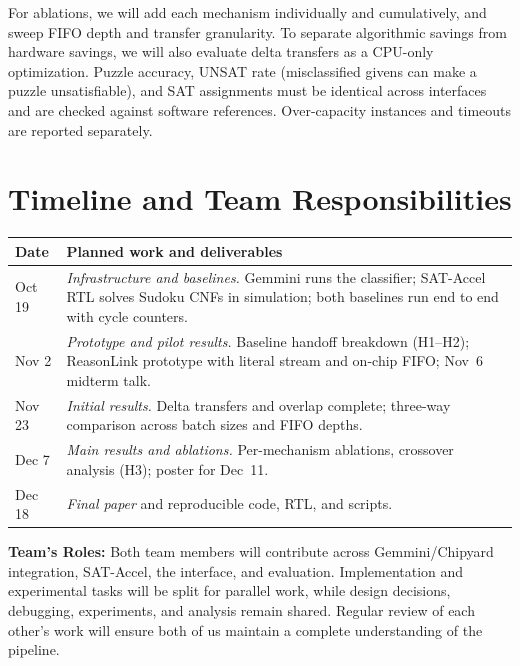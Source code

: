 \documentclass[conference,10pt,letterpaper]{IEEEtran}
\begin{document}
For ablations, we will add each mechanism individually and cumulatively, and sweep FIFO depth and transfer granularity. To separate algorithmic savings from hardware savings, we will also evaluate delta transfers as a CPU-only optimization. Puzzle accuracy, UNSAT rate (misclassified givens can make a puzzle unsatisfiable), and SAT assignments must be identical across interfaces and are checked against software references. Over-capacity instances and timeouts are reported separately.

\section{Timeline and Team Responsibilities}
\begin{center}
\begin{tabularx}{\columnwidth}{@{}P{0.15\columnwidth}Y@{}}
\toprule
\textbf{Date} & \textbf{Planned work and deliverables} \\
\midrule
Oct 19 & \emph{Infrastructure and baselines.} Gemmini runs the classifier; SAT-Accel RTL solves Sudoku CNFs in simulation; both baselines run end to end with cycle counters. \\
Nov 2 & \emph{Prototype and pilot results.} Baseline handoff breakdown (H1--H2); ReasonLink prototype with literal stream and on-chip FIFO; Nov~6 midterm talk. \\
Nov 23 & \emph{Initial results.} Delta transfers and overlap complete; three-way comparison across batch sizes and FIFO depths. \\
Dec 7 & \emph{Main results and ablations.} Per-mechanism ablations, crossover analysis (H3); poster for Dec~11. \\
Dec 18 & \emph{Final paper} and reproducible code, RTL, and scripts. \\
\bottomrule
\end{tabularx}
\end{center}


\textbf{Team's Roles: } Both team members will contribute across Gemmini/Chipyard integration, SAT-Accel, the interface, and evaluation. Implementation and experimental tasks will be split for parallel work, while design decisions, debugging, experiments, and analysis remain shared. Regular review of each other’s work will ensure both of us maintain a complete understanding of the pipeline.

\clearpage


\end{document}
